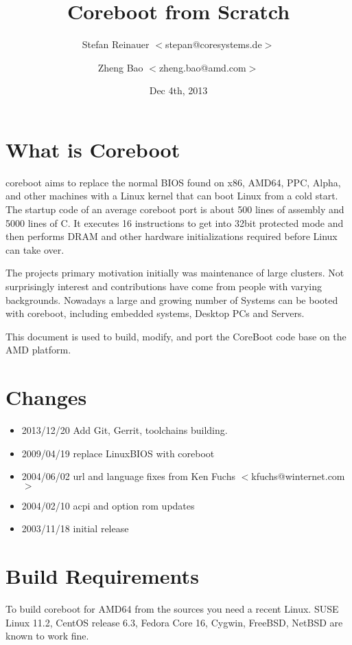 \documentclass[titlepage,12pt]{article}
\title{Coreboot from Scratch}
\author{Stefan Reinauer $<$stepan@coresystems.de$>$\and Zheng Bao $<$zheng.bao@amd.com$>$}
\date{Dec 4th, 2013}
\begin{document}
\maketitle

\thispagestyle{empty}

\tableofcontents

\newpage

\section{What is Coreboot}
coreboot aims to replace the normal BIOS found on x86, AMD64, PPC,
Alpha, and other machines with a Linux kernel that can boot Linux from a cold
start. The startup code of an average coreboot port is about 500 lines of
assembly and 5000 lines of C. It executes 16 instructions to get into 32bit
protected mode and then performs DRAM and other hardware initializations
required before Linux can take over.

The projects primary motivation initially was maintenance of large
clusters. Not surprisingly interest and contributions have come from
people with varying backgrounds.  Nowadays a large and growing number of
Systems can be booted with coreboot, including embedded systems,
Desktop PCs and Servers.

This document is used to build, modify, and port the CoreBoot code
base on the AMD platform.


\section{Changes}

 \begin{itemize}
 \item 2013/12/20 Add Git, Gerrit, toolchains building.
 \item 2009/04/19 replace LinuxBIOS with coreboot
 \item 2004/06/02 url and language fixes from Ken Fuchs $<$kfuchs@winternet.com$>$
 \item 2004/02/10 acpi and option rom updates
 \item 2003/11/18 initial release
 \end{itemize}

%
%

\section{Build Requirements}
To build coreboot for AMD64 from the sources you need a recent Linux.
SUSE Linux 11.2, CentOS release 6.3, Fedora Core 16, Cygwin, FreeBSD,
NetBSD are known to work fine.
\end{document}
